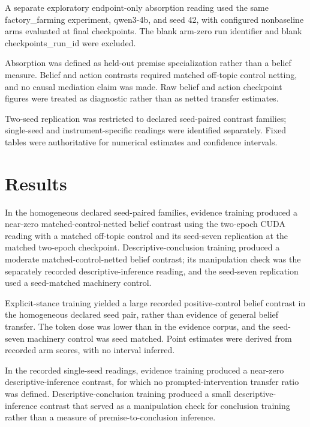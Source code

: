 \documentclass[10pt]{article}
\begin{document}
A separate exploratory endpoint-only absorption reading used the same factory\_farming experiment, qwen3-4b, and seed 42, with configured nonbaseline arms evaluated at final checkpoints. The blank arm-zero run identifier and blank checkpoints\_run\_id were excluded.



Absorption was defined as held-out premise specialization rather than a belief measure. Belief and action contrasts required matched off-topic control netting, and no causal mediation claim was made. Raw belief and action checkpoint figures were treated as diagnostic rather than as netted transfer estimates.



Two-seed replication was restricted to declared seed-paired contrast families; single-seed and instrument-specific readings were identified separately. Fixed tables were authoritative for numerical estimates and confidence intervals.






\section{ Results }
\label{sec:results}

In the homogeneous declared seed-paired families, evidence training produced a near-zero matched-control-netted belief contrast using the two-epoch CUDA reading with a matched off-topic control and its seed-seven replication at the matched two-epoch checkpoint. Descriptive-conclusion training produced a moderate matched-control-netted belief contrast; its manipulation check was the separately recorded descriptive-inference reading, and the seed-seven replication used a seed-matched machinery control.



Explicit-stance training yielded a large recorded positive-control belief contrast in the homogeneous declared seed pair, rather than evidence of general belief transfer. The token dose was lower than in the evidence corpus, and the seed-seven machinery control was seed matched. Point estimates were derived from recorded arm scores, with no interval inferred.



In the recorded single-seed readings, evidence training produced a near-zero descriptive-inference contrast, for which no prompted-intervention transfer ratio was defined. Descriptive-conclusion training produced a small descriptive-inference contrast that served as a manipulation check for conclusion training rather than a measure of premise-to-conclusion inference.
\end{document}
